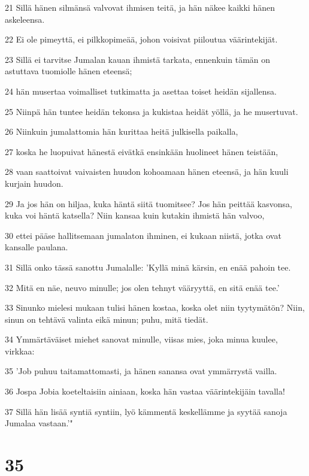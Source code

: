 \par 21 Sillä hänen silmänsä valvovat ihmisen teitä, ja hän näkee kaikki hänen askeleensa.
\par 22 Ei ole pimeyttä, ei pilkkopimeää, johon voisivat piiloutua väärintekijät.
\par 23 Sillä ei tarvitse Jumalan kauan ihmistä tarkata, ennenkuin tämän on astuttava tuomiolle hänen eteensä;
\par 24 hän musertaa voimalliset tutkimatta ja asettaa toiset heidän sijallensa.
\par 25 Niinpä hän tuntee heidän tekonsa ja kukistaa heidät yöllä, ja he musertuvat.
\par 26 Niinkuin jumalattomia hän kurittaa heitä julkisella paikalla,
\par 27 koska he luopuivat hänestä eivätkä ensinkään huolineet hänen teistään,
\par 28 vaan saattoivat vaivaisten huudon kohoamaan hänen eteensä, ja hän kuuli kurjain huudon.
\par 29 Ja jos hän on hiljaa, kuka häntä siitä tuomitsee? Jos hän peittää kasvonsa, kuka voi häntä katsella? Niin kansaa kuin kutakin ihmistä hän valvoo,
\par 30 ettei pääse hallitsemaan jumalaton ihminen, ei kukaan niistä, jotka ovat kansalle paulana.
\par 31 Sillä onko tässä sanottu Jumalalle: 'Kyllä minä kärsin, en enää pahoin tee.
\par 32 Mitä en näe, neuvo minulle; jos olen tehnyt vääryyttä, en sitä enää tee.'
\par 33 Sinunko mielesi mukaan tulisi hänen kostaa, koska olet niin tyytymätön? Niin, sinun on tehtävä valinta eikä minun; puhu, mitä tiedät.
\par 34 Ymmärtäväiset miehet sanovat minulle, viisas mies, joka minua kuulee, virkkaa:
\par 35 'Job puhuu taitamattomasti, ja hänen sanansa ovat ymmärrystä vailla.
\par 36 Jospa Jobia koeteltaisiin ainiaan, koska hän vastaa väärintekijäin tavalla!
\par 37 Sillä hän lisää syntiä syntiin, lyö kämmentä keskellämme ja syytää sanoja Jumalaa vastaan.'"

\chapter{35}

